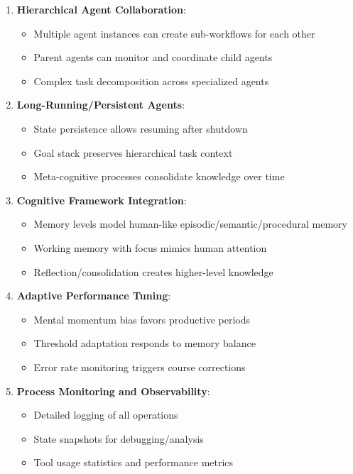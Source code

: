 \documentclass[12pt,a4paper]{article}
\begin{document}
\begin{enumerate}[label=\arabic*.]
    \item \textbf{Hierarchical Agent Collaboration}:
    \begin{itemize}
        \item Multiple agent instances can create sub-workflows for each other
        \item Parent agents can monitor and coordinate child agents
        \item Complex task decomposition across specialized agents
    \end{itemize}
    \item \textbf{Long-Running/Persistent Agents}:
    \begin{itemize}
        \item State persistence allows resuming after shutdown
        \item Goal stack preserves hierarchical task context
        \item Meta-cognitive processes consolidate knowledge over time
    \end{itemize}
    \item \textbf{Cognitive Framework Integration}:
    \begin{itemize}
        \item Memory levels model human-like episodic/semantic/procedural memory
        \item Working memory with focus mimics human attention
        \item Reflection/consolidation creates higher-level knowledge
    \end{itemize}
    \item \textbf{Adaptive Performance Tuning}:
    \begin{itemize}
        \item Mental momentum bias favors productive periods
        \item Threshold adaptation responds to memory balance
        \item Error rate monitoring triggers course corrections
    \end{itemize}
    \item \textbf{Process Monitoring and Observability}:
    \begin{itemize}
        \item Detailed logging of all operations
        \item State snapshots for debugging/analysis
        \item Tool usage statistics and performance metrics
    \end{itemize}
\end{enumerate}
\end{document}
